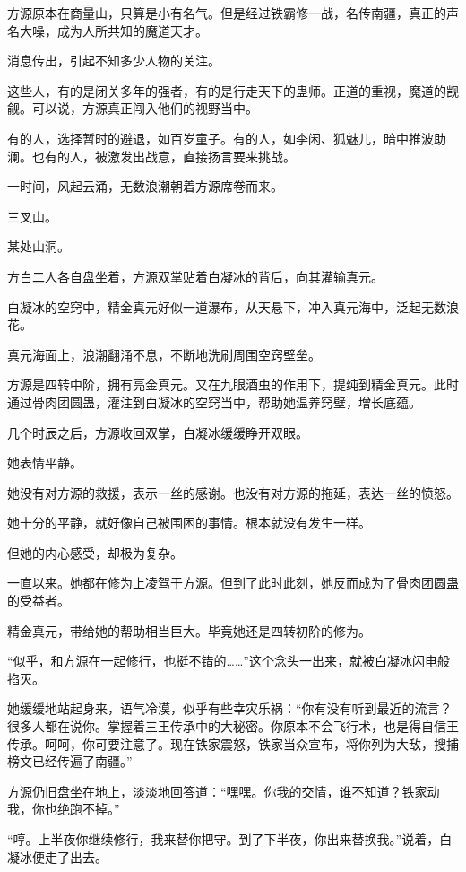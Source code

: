 
\begin{this_body}

方源原本在商量山，只算是小有名气。但是经过铁霸修一战，名传南疆，真正的声名大噪，成为人所共知的魔道天才。

消息传出，引起不知多少人物的关注。

这些人，有的是闭关多年的强者，有的是行走天下的蛊师。正道的重视，魔道的觊觎。可以说，方源真正闯入他们的视野当中。

有的人，选择暂时的避退，如百岁童子。有的人，如李闲、狐魅儿，暗中推波助澜。也有的人，被激发出战意，直接扬言要来挑战。

一时间，风起云涌，无数浪潮朝着方源席卷而来。

三叉山。

某处山洞。

方白二人各自盘坐着，方源双掌贴着白凝冰的背后，向其灌输真元。

白凝冰的空窍中，精金真元好似一道瀑布，从天悬下，冲入真元海中，泛起无数浪花。

真元海面上，浪潮翻涌不息，不断地洗刷周围空窍壁垒。

方源是四转中阶，拥有亮金真元。又在九眼酒虫的作用下，提纯到精金真元。此时通过骨肉团圆蛊，灌注到白凝冰的空窍当中，帮助她温养窍壁，增长底蕴。

几个时辰之后，方源收回双掌，白凝冰缓缓睁开双眼。

她表情平静。

她没有对方源的救援，表示一丝的感谢。也没有对方源的拖延，表达一丝的愤怒。

她十分的平静，就好像自己被围困的事情。根本就没有发生一样。

但她的内心感受，却极为复杂。

一直以来。她都在修为上凌驾于方源。但到了此时此刻，她反而成为了骨肉团圆蛊的受益者。

精金真元，带给她的帮助相当巨大。毕竟她还是四转初阶的修为。

“似乎，和方源在一起修行，也挺不错的……”这个念头一出来，就被白凝冰闪电般掐灭。

她缓缓地站起身来，语气冷漠，似乎有些幸灾乐祸：“你有没有听到最近的流言？很多人都在说你。掌握着三王传承中的大秘密。你原本不会飞行术，也是得自信王传承。呵呵，你可要注意了。现在铁家震怒，铁家当众宣布，将你列为大敌，搜捕榜文已经传遍了南疆。”

方源仍旧盘坐在地上，淡淡地回答道：“嘿嘿。你我的交情，谁不知道？铁家动我，你也绝跑不掉。”

“哼。上半夜你继续修行，我来替你把守。到了下半夜，你出来替换我。”说着，白凝冰便走了出去。


\end{this_body}
